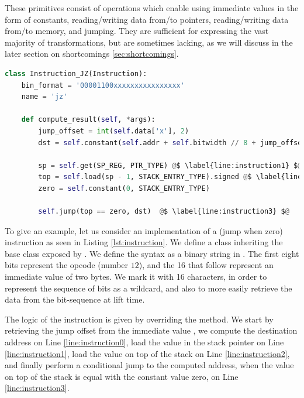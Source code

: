 These primitives consist of operations which enable using immediate values in the form of constants, reading/writing data from/to pointers, reading/writing data from/to memory, and jumping. They are sufficient for expressing the vast majority of transformations, but are sometimes lacking, as we will discuss in the later section on shortcomings \ref{sec:shortcomings}.

\begin{lstlisting}[language=python, label={lst:instruction}, caption={Implementation of a conditional jump instruction, as part of the lifter module.}]
class Instruction_JZ(Instruction):
    bin_format = '00001100xxxxxxxxxxxxxxxx'
    name = 'jz'

    def compute_result(self, *args):
        jump_offset = int(self.data['x'], 2)
        dst = self.constant(self.addr + self.bitwidth // 8 + jump_offset, Type.int_16).signed @$ \label{line:instruction0} $@

        sp = self.get(SP_REG, PTR_TYPE) @$ \label{line:instruction1} $@
        top = self.load(sp - 1, STACK_ENTRY_TYPE).signed @$ \label{line:instruction2} $@
        zero = self.constant(0, STACK_ENTRY_TYPE)

        self.jump(top == zero, dst)  @$ \label{line:instruction3} $@
\end{lstlisting}

To give an example, let us consider an implementation of a  (jump when zero) instruction as seen in Listing \ref{lst:instruction}. We define a class inheriting the base  class exposed by . We define the syntax as a binary string in . The first eight bits represent the opcode (number $12$), and the 16 that follow represent an immediate value of two bytes. We mark it with 16  characters, in order to represent the sequence of bits as a wildcard, and also to more easily retrieve the data from the bit-sequence at lift time. 

The logic of the instruction is given by overriding the  method. We start by retrieving the jump offset from the immediate value , we compute the destination address on Line \ref{line:instruction0}, load the value in the stack pointer on Line \ref{line:instruction1}, load the value on top of the stack on Line \ref{line:instruction2}, and finally perform a conditional jump to the computed address, when the value on top of the stack is equal with the constant value zero, on Line \ref{line:instruction3}.

